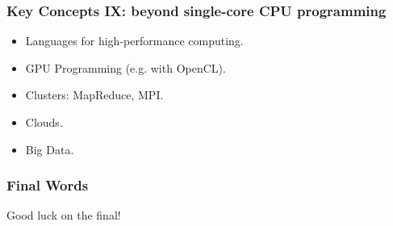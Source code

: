 \documentclass[aspectratio=43]{beamer}
\newenvironment{changemargin}[1]{%
  \begin{list}{}{%
    \setlength{\topsep}{0pt}%
    \setlength{\leftmargin}{#1}%
    \setlength{\rightmargin}{1em}
    \setlength{\listparindent}{\parindent}%
    \setlength{\itemindent}{\parindent}%
    \setlength{\parsep}{\parskip}%
  }%
  \item[]}{\end{list}}
\begin{document}
\begin{frame}
  \frametitle{Key Concepts IX: beyond single-core CPU programming}

  \begin{changemargin}{2cm}
  \begin{itemize}
    \item Languages for high-performance computing.
    \item GPU Programming (e.g. with OpenCL).
    \item Clusters: MapReduce, MPI.
    \item Clouds.
    \item Big Data.
  \end{itemize}
  \end{changemargin}
\end{frame}

\begin{frame}
  \frametitle{Final Words}

  \begin{changemargin}{2cm}
    Good luck on the final!
  \end{changemargin}
\end{frame}
\end{document}

